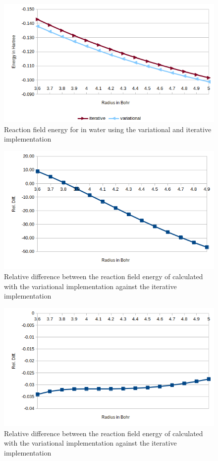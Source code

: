 \documentclass[../master_thesis.tex]{subfiles}
\begin{document}
\begin{figure}[!htb]
  \centering
  \includegraphics[width=0.75\linewidth]{img/lipvarEr.png}
  \caption{Reaction field energy for  in water using the variational and iterative implementation}
  \label{fig:lipvarEr}
\end{figure}

\begin{figure}[!htb]
  \centering
    \includegraphics[width=\linewidth]{img/watitervarreldiff.png}
  \caption{Relative difference between the reaction field energy of  calculated with the variational implementation against the iterative implementation}
  \label{fig:watreldiffvardaug}
\end{figure}

\begin{figure}[!htb]
  \centering
    \includegraphics[width=\linewidth]{img/lipitervarreldiff.png}
  \caption{Relative difference between the reaction field energy of  calculated with the variational implementation against the iterative implementation}
  \label{fig:lipreldiffvardaug}
\end{figure}
\clearpage
\end{document}
